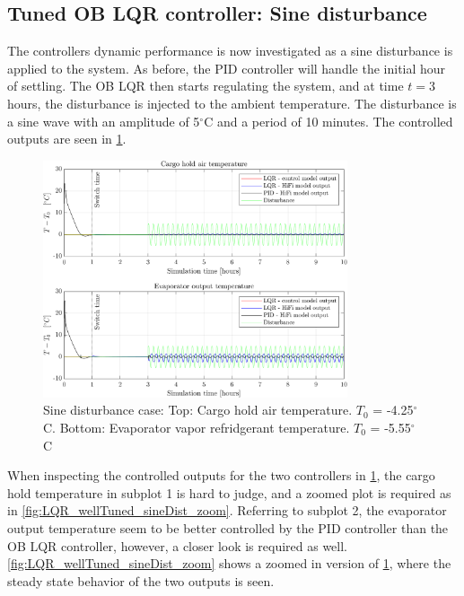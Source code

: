 \newpage
\subsection{Tuned OB LQR controller: Sine disturbance}
The controllers dynamic performance is now investigated as a sine disturbance is applied to the system. As before, the PID controller will handle the initial hour of settling. The OB LQR then starts regulating the system, and at time $t=3$ hours, the disturbance is injected to the ambient temperature. The disturbance is a sine wave with an amplitude of 5$^{\circ}$C and a period of 10 minutes. The controlled outputs are seen in \cref{fig:LQR_wellTuned_sineDist}.

\begin{figure}[H]
	\centering
	\includegraphics[width=0.8\textwidth]{Graphics/fig_LQRvsKresten_sineDist.png}
	\caption{Sine disturbance case: Top: Cargo hold air temperature. $T_0$ = -4.25$^{\circ}$C. Bottom: Evaporator vapor refridgerant temperature. $T_0$ = -5.55$^{\circ}$C}
	\label{fig:LQR_wellTuned_sineDist}
\end{figure}

\noindent When inspecting the controlled outputs for the two controllers in \cref{fig:LQR_wellTuned_sineDist}, the cargo hold temperature in subplot 1 is hard to judge, and a zoomed plot is required as in \cref{fig:LQR_wellTuned_sineDist_zoom}. Referring to subplot 2, the evaporator output temperature seem to be better controlled by the PID controller than the OB LQR controller, however, a closer look is required as well. \cref{fig:LQR_wellTuned_sineDist_zoom} shows a zoomed in version of \cref{fig:LQR_wellTuned_sineDist}, where the steady state behavior of the two outputs is seen.

